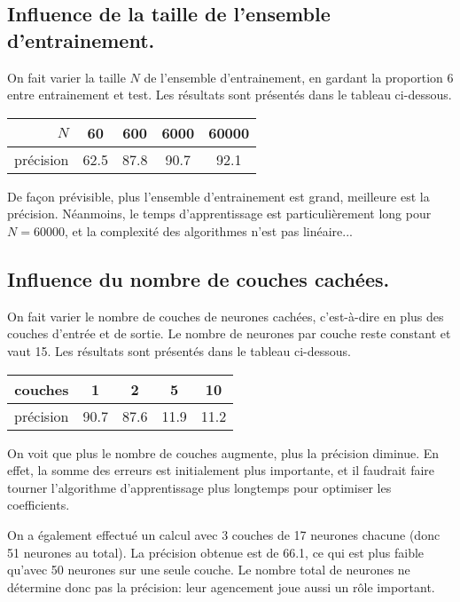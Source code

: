 \documentclass[a4paper, 12pt]{article}
\begin{document}
\subsection{Influence de la taille de l'ensemble d'entrainement.}
On fait varier la taille $N$ de l'ensemble d'entrainement, en gardant la proportion 6 entre entrainement et test.
Les résultats sont présentés dans le tableau ci-dessous.
\begin{center}
    \begin{tabular}{|r|c|c|c|c|}
        \hline
        $N$ & 60 & 600 & \num{6000} & \num{60000} \\
        \hline
        précision & \num{62.5} & \num{87.8} & \num{90.7} & \num{92.1} \\
        \hline
    \end{tabular}
\end{center}
De façon prévisible, plus l'ensemble d'entrainement est grand, meilleure est la précision.
Néanmoins, le temps d'apprentissage est particulièrement long pour $N = \num{60000}$, et la complexité des algorithmes n'est pas linéaire...

\subsection{Influence du nombre de couches cachées.}
On fait varier le nombre de couches de neurones \og{}cachées\fg{}, c'est-à-dire en plus des couches d'entrée et de sortie.
Le nombre de neurones par couche reste constant et vaut 15.
Les résultats sont présentés dans le tableau ci-dessous.
\begin{center}
    \begin{tabular}{|r|c|c|c|c|}
        \hline
        couches & 1 & 2 & 5 & 10 \\
        \hline
        précision & \num{90.7} & \num{87.6} & \num{11.9} & \num{11.2} \\
        \hline
    \end{tabular}
\end{center}
On voit que plus le nombre de couches augmente, plus la précision diminue.
En effet, la somme des erreurs est initialement plus importante, et il faudrait faire tourner l'algorithme d'apprentissage plus longtemps pour optimiser les coefficients.

On a également effectué un calcul avec 3 couches de 17 neurones chacune (donc 51 neurones au total).
La précision obtenue est de \num{66.1}, ce qui est plus faible qu'avec 50 neurones sur une seule couche.
Le nombre total de neurones ne détermine donc pas la précision: leur agencement joue aussi un rôle important.
\end{document}

